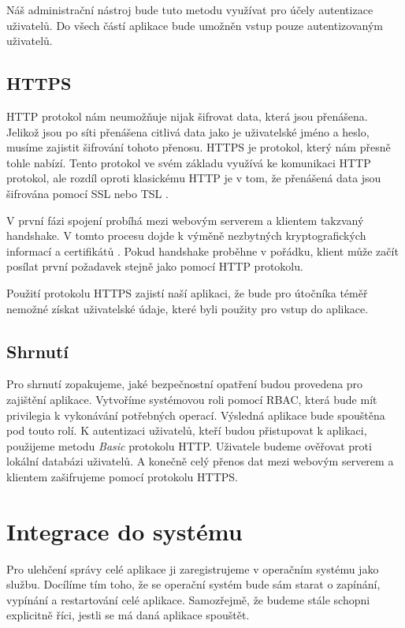     Náš administrační nástroj bude tuto metodu využívat pro účely autentizace uživatelů. Do všech částí aplikace bude umožněn vstup pouze autentizovaným uživatelů.

    \subsection{HTTPS}
    \label{https}
    HTTP protokol nám neumožňuje nijak šifrovat data, která jsou přenášena. Jelikož jsou po síti přenášena citlivá data jako je uživatelské jméno a heslo, musíme zajistit šifrování tohoto přenosu. HTTPS je protokol, který nám přesně tohle nabízí. Tento protokol ve svém základu využívá ke komunikaci HTTP protokol, ale rozdíl oproti klasickému HTTP je v tom, že přenášená data jsou šifrována pomocí SSL nebo TSL \cite{RFC2818}.

    V první fázi spojení probíhá mezi webovým serverem a klientem takzvaný handshake. V tomto procesu dojde k výměně nezbytných kryptografických informací a certifikátů \cite{RFC5246}. Pokud handshake proběhne v pořádku, klient může začít posílat první požadavek stejně jako pomocí HTTP protokolu.

    Použití protokolu HTTPS zajistí naší aplikaci, že bude pro útočníka téměř nemožné získat uživatelské údaje, které byli použity pro vstup do aplikace.
    \subsection{Shrnutí}
    Pro shrnutí zopakujeme, jaké bezpečnostní opatření budou provedena pro zajištění aplikace. Vytvoříme systémovou roli pomocí RBAC, která bude mít privilegia k vykonávání potřebných operací. Výsledná aplikace bude spouštěna pod touto rolí. K autentizaci uživatelů, kteří budou přistupovat k aplikaci, použijeme metodu \emph{Basic} protokolu HTTP. Uživatele budeme ověřovat proti lokální databázi uživatelů. A konečně celý přenos dat mezi webovým serverem a klientem zašifrujeme pomocí protokolu HTTPS.

\section{Integrace do systému}
Pro ulehčení správy celé aplikace ji zaregistrujeme v operačním systému jako službu. Docílíme tím toho, že se operační systém bude sám starat o zapínání, vypínání a restartování celé aplikace. Samozřejmě, že budeme stále schopni explicitně říci, jestli se má daná aplikace spouštět.

